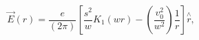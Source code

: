 \begin{equation}
\overrightarrow{E}(r)=\frac{e}{(2\pi)}\left[  \frac{s^{2}}{w}K_{1}\left(
wr\right)  -\left(  \frac{v_{0}^{2}}{w^{2}}\right)  \frac{1}{r}\right]
\overset{\wedge}{r}, \label{E2}%
\end{equation}

